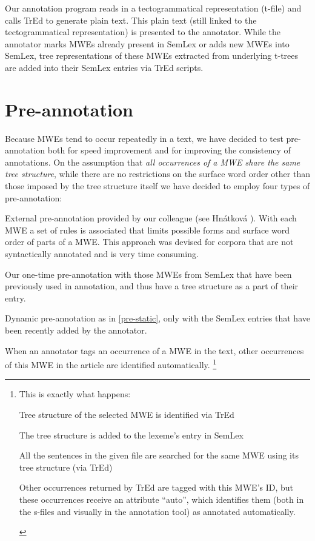 Our annotation program reads in a tectogrammatical representation (t-file) and calls TrEd \cite{pajas:tred} to generate plain text. This plain text (still linked to the tectogrammatical representation) is presented to the annotator. While the annotator marks MWEs already present in SemLex or adds new MWEs into SemLex, tree representations of these MWEs extracted from underlying t-trees are added into their SemLex entries via TrEd scripts. 



\section{Pre-annotation}
\label{sec:pre}
Because MWEs tend to occur repeatedly in a text, we have decided to test pre-annotation both for speed improvement and for improving the consistency of annotations. 
On the assumption that {\it all occurrences of a MWE share the same tree structure}, while there are no restrictions on the surface word order other than those imposed by the tree structure itself
%
we have decided to employ four types of pre-annotation:

\begin{asparaenum}[A)]
\item \label{pre-hnatkova}External pre-annotation provided by our colleague (see Hnátková \citeyear{hnatkova:2002}). With each MWE a set of rules is associated that limits possible forms and surface word order of parts of a MWE. This approach was devised for corpora that are not syntactically annotated and is very time consuming.
\item \label{pre-static}Our one-time pre-annotation with those MWEs from SemLex that have been previously used in annotation, and thus have a tree structure as a part of their entry.
\item \label{pre-on-load}Dynamic pre-annotation as in \ref{pre-static}, only with the SemLex entries that have been recently added by the annotator. 
\item \label{pre-on-annot}When an annotator tags an occurrence of a MWE in the text, other occurrences of this MWE in the article are identified automatically.%
%
\footnote{This is exactly what happens:
\begin{inparaenum}[1)]
\item Tree structure of the selected MWE is identified via TrEd
\item The tree structure is added to the lexeme's entry in SemLex
\item All the sentences in the given file are searched for the same MWE using its tree structure (via TrEd)
\item Other occurrences returned by TrEd are tagged with this MWE's ID, but these occurrences receive an attribute ``auto'', which identifies them (both in the s-files and visually in the annotation tool) as annotated automatically.
\end{inparaenum}
} %
\end{asparaenum}

